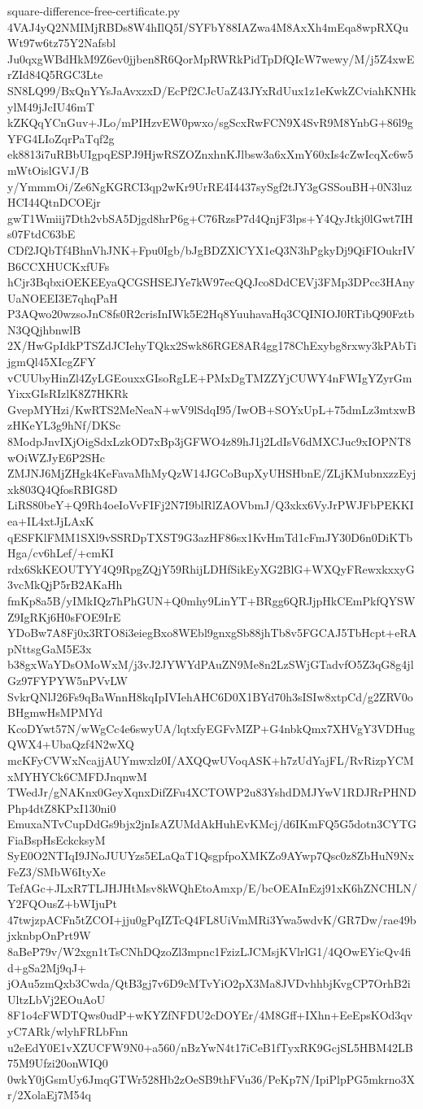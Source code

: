 \documentclass[11pt]{article}
\theoremstyle{definition}
\theoremstyle{remark}
\begin{document}
\begin{filecontents*}[overwrite]{square-difference-free-certificate.py}
4VAJ4yQ2NMIMjRBDs8W4hIlQ5I/SYFbY88IAZwa4M8AxXh4mEqa8wpRXQuWt97w6tz75Y2Nafsbl
Ju0qxgWBdHkM9Z6ev0jjben8R6QorMpRWRkPidTpDfQIcW7wewy/M/j5Z4xwErZId84Q5RGC3Lte
SN8LQ99/BxQnYYsJaAvxzxD/EcPf2CJcUaZ43JYxRdUux1z1eKwkZCviahKNHkylM49jJcIU46mT
kZKQqYCnGuv+JLo/mPIHzvEW0pwxo/sgScxRwFCN9X4SvR9M8YnbG+86l9gYFG4LIoZqrPaTqf2g
ek8813i7uRBbUIgpqESPJ9HjwRSZOZnxhnKJlbsw3a6xXmY60xIs4cZwIcqXc6w5mWtOislGVJ/B
y/YmmmOi/Ze6NgKGRCI3qp2wKr9UrRE4I4437sySgf2tJY3gGSSouBH+0N3luzHCI44QtnDCOEjr
gwT1Wmiij7Dth2vbSA5Djgd8hrP6g+C76RzsP7d4QnjF3lps+Y4QyJtkj0lGwt7IHs07FtdC63bE
CDf2JQbTf4BhnVhJNK+Fpu0Igb/bJgBDZXlCYX1eQ3N3hPgkyDj9QiFIOukrIVB6CCXHUCKxfUFs
hCjr3BqbxiOEKEEyaQCGSHSEJYe7kW97ecQQJco8DdCEVj3FMp3DPcc3HAnyUaNOEEI3E7qhqPaH
P3AQwo20wzsoJnC8fs0R2crisInIWk5E2Hq8YuuhavaHq3CQINIOJ0RTibQ90FztbN3QQjhbnwlB
2X/HwGpIdkPTSZdJCIehyTQkx2Swk86RGE8AR4gg178ChExybg8rxwy3kPAbTijgmQl45XIcgZFY
vCUUbyHinZl4ZyLGEouxxGIsoRgLE+PMxDgTMZZYjCUWY4nFWIgYZyrGmYixxGIsRIzlK8Z7HKRk
GvepMYHzi/KwRTS2MeNeaN+wV9lSdqI95/IwOB+SOYxUpL+75dmLz3mtxwBzHKeYL3g9hNf/DKSc
8ModpJnvIXjOigSdxLzkOD7xBp3jGFWO4z89hJ1j2LdIsV6dMXCJuc9xIOPNT8wOiWZJyE6P2SHc
ZMJNJ6MjZHgk4KeFavaMhMyQzW14JGCoBupXyUHSHbnE/ZLjKMubnxzzEyjxk803Q4QfosRBIG8D
LiRS80beY+Q9Rh4oeIoVvFIFj2N7I9blRlZAOVbmJ/Q3xkx6VyJrPWJFbPEKKIea+IL4xtJjLAxK
qESFKlFMM1SXl9vSSRDpTXST9G3azHF86sx1KvHmTd1cFmJY30D6n0DiKTbHga/cv6hLef/+cmKI
rdx6SkKEOUTYY4Q9RpgZQjY59RhijLDHfSikEyXG2BlG+WXQyFRewxkxxyG3vcMkQjP5rB2AKaHh
fmKp8a5B/yIMkIQz7hPhGUN+Q0mhy9LinYT+BRgg6QRJjpHkCEmPkfQYSWZ9IgRKj6H0sFOE9IrE
YDoBw7A8Fj0x3RTO8i3eiegBxo8WEbl9gnxgSb88jhTb8v5FGCAJ5TbHcpt+eRApNttsgGaM5E3x
b38gxWaYDsOMoWxM/j3vJ2JYWYdPAuZN9Me8n2LzSWjGTadvfO5Z3qG8g4jlGz97FYPYW5nPVvLW
SvkrQNlJ26Fs9qBaWnnH8kqIpIVIehAHC6D0X1BYd70h3sISIw8xtpCd/g2ZRV0oBHgmwHsMPMYd
KcoDYwt57N/wWgCc4e6swyUA/lqtxfyEGFvMZP+G4nbkQmx7XHVgY3VDHugQWX4+UbaQzf4N2wXQ
mcKFyCVWxNcajjAUYmwxlz0I/AXQQwUVoqASK+h7zUdYajFL/RvRizpYCMxMYHYCk6CMFDJnqnwM
TWedJr/gNAKnx0GeyXqnxDifZFu4XCTOWP2u83YshdDMJYwV1RDJRrPHNDPhp4dtZ8KPxI130ni0
EmuxaNTvCupDdGs9bjx2jnIsAZUMdAkHuhEvKMcj/d6IKmFQ5G5dotn3CYTGFiaBspHsEckcksyM
SyE0O2NTIqI9JNoJUUYzs5ELaQaT1QsgpfpoXMKZo9AYwp7Qsc0z8ZbHuN9NxFeZ3/SMbW6ItyXe
TefAGc+JLxR7TLJHJHtMsv8kWQhEtoAmxp/E/bcOEAInEzj91xK6hZNCHLN/Y2FQOusZ+bWIjuPt
47twjzpACFn5tZCOI+jju0gPqIZTcQ4FL8UiVmMRi3Ywa5wdvK/GR7Dw/rae49bjxknbpOnPrt9W
8aBeP79v/W2xgn1tTsCNhDQzoZl3mpnc1FzizLJCMsjKVlrlG1/4QOwEYicQv4fid+gSa2Mj9qJ+
jOAu5zmQxb3Cwda/QtB3gj7v6D9cMTvYiO2pX3Ma8JVDvhhbjKvgCP7OrhB2iUltzLbVj2EOuAoU
8F1o4cFWDTQws0udP+wKYZfNFDU2cDOYEr/4M8Gff+IXhn+EeEpsKOd3qvyC7ARk/wlyhFRLbFnn
u2eEdY0E1vXZUCFW9N0+a560/nBzYwN4t17iCeB1fTyxRK9GcjSL5HBM42LB75M9Ufzi20onWIQ0
0wkY0jGsmUy6JmqGTWr528Hb2zOeSB9thFVu36/PeKp7N/IpiPlpPG5mkrno3Xr/2XolaEj7M54q

\end{filecontents*}
\end{document}
